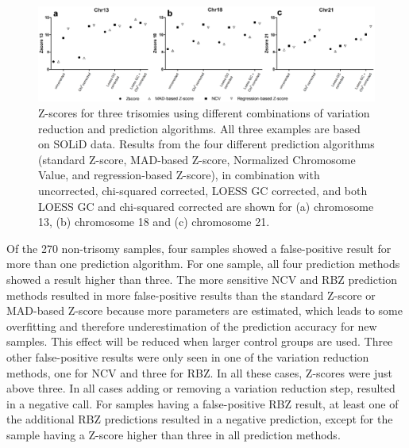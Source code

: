 \begin{figure}
	\includegraphics[width=1.0\linewidth]{img/Algorithms_NIPT_Fig6}
	\caption[Z-scores for three trisomies]{Z-scores for three trisomies using different combinations of variation reduction and prediction algorithms. All three examples are based on SOLiD data. Results from the four different prediction algorithms (standard Z-score, MAD-based Z-score, Normalized Chromosome Value, and regression-based Z-score), in combination with uncorrected, chi-squared corrected, LOESS GC corrected, and both LOESS GC and chi-squared corrected are shown for (a) chromosome 13, (b) chromosome 18 and (c) chromosome 21.}
	\label{fig:Algorithms_NIPT_Fig6}
\end{figure}

Of the 270 non-trisomy samples, four samples showed a false-positive result for more than one prediction algorithm. 
For one sample, all four prediction methods showed a result higher than three. The more sensitive NCV and RBZ prediction methods resulted in more false-positive results than the standard Z-score or MAD-based Z-score because more parameters are estimated, which leads to some overfitting and therefore underestimation of the prediction accuracy for new samples. 
This effect will be reduced when larger control groups are used. 
Three other false-positive results were only seen in one of the variation reduction methods, one for NCV and three for RBZ. In all these cases, Z-scores were just above three. 
In all cases adding or removing a variation reduction step, resulted in a negative call. 
For samples having a false-positive RBZ result, at least one of the additional RBZ predictions resulted in a negative prediction, except for the sample having a Z-score higher than three in all prediction methods.

